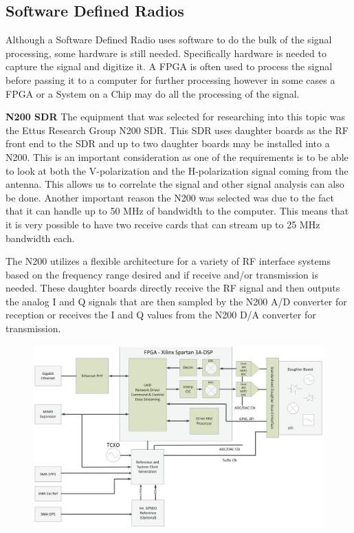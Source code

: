 \subsection{Software Defined Radios}

Although a Software Defined Radio uses software to do the bulk of the signal processing, some hardware is still needed.  Specifically hardware is needed to capture the signal and digitize it.  A FPGA is often used to process the signal before passing it to a computer for further processing however in some cases a FPGA or a System on a Chip may do all the processing of the signal.

\textbf{N200 SDR} The equipment that was selected for researching into this topic was the Ettus Research Group N200 SDR.  This SDR uses daughter boards as the RF front end to the SDR and up to two daughter boards may be installed into a N200.  This is an important consideration as one of the requirements is to be able to look at both the V-polarization and the H-polarization signal coming from the antenna.  This allows us to correlate the signal and other signal analysis can also be done.  Another important reason the N200 was selected was due to the fact that it can handle up to 50 MHz of bandwidth to the computer.  This means that it is very possible to have two receive cards that can stream up to 25 MHz bandwidth each.  

The N200 utilizes a flexible architecture for a variety of RF interface systems based on the frequency range desired and if receive and/or transmission is needed.  These daughter boards directly receive the RF signal and then outputs the analog I and Q signals that are then sampled by the N200 A/D converter for reception or receives the I and Q values from the N200 D/A converter for transmission. 

 {\begin{figure}[h!tb] 
\centering
\includegraphics[width=14cm]{Images/n200_block_edited}
\label{N200_block}
\end{figure}
}

